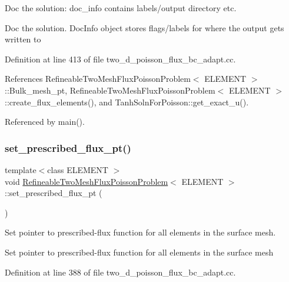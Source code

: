Doc the solution\+: doc\+\_\+info contains labels/output directory etc. 

Doc the solution. Doc\+Info object stores flags/labels for where the output gets written to 

Definition at line 413 of file two\+\_\+d\+\_\+poisson\+\_\+flux\+\_\+bc\+\_\+adapt.\+cc.



References Refineable\+Two\+Mesh\+Flux\+Poisson\+Problem$<$ E\+L\+E\+M\+E\+N\+T $>$\+::\+Bulk\+\_\+mesh\+\_\+pt, Refineable\+Two\+Mesh\+Flux\+Poisson\+Problem$<$ E\+L\+E\+M\+E\+N\+T $>$\+::create\+\_\+flux\+\_\+elements(), and Tanh\+Soln\+For\+Poisson\+::get\+\_\+exact\+\_\+u().



Referenced by main().

\mbox{\label{classRefineableTwoMeshFluxPoissonProblem_aa0aeec40bbdb0649e309e51ad96e5da7}} 
\subsubsection{\texorpdfstring{set\+\_\+prescribed\+\_\+flux\+\_\+pt()}{set\_prescribed\_flux\_pt()}}
{\footnotesize\ttfamily template$<$class E\+L\+E\+M\+E\+NT $>$ \\
void \hyperlink{classRefineableTwoMeshFluxPoissonProblem}{Refineable\+Two\+Mesh\+Flux\+Poisson\+Problem}$<$ E\+L\+E\+M\+E\+NT $>$\+::set\+\_\+prescribed\+\_\+flux\+\_\+pt (\begin{DoxyParamCaption}{ }\end{DoxyParamCaption})\hspace{0.3cm}{\ttfamily [private]}}



Set pointer to prescribed-\/flux function for all elements in the surface mesh. 

Set pointer to prescribed-\/flux function for all elements in the surface mesh 

Definition at line 388 of file two\+\_\+d\+\_\+poisson\+\_\+flux\+\_\+bc\+\_\+adapt.\+cc.



